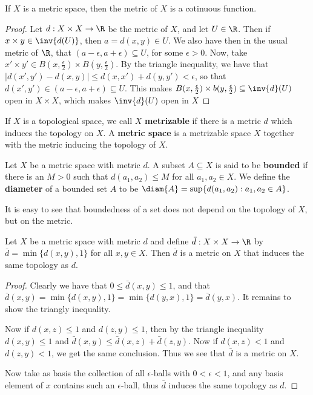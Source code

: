 \begin{lemma}\label{2.2.3}
    If $X$ is a metric space, then the metric of  $X$ is a cotinuous function.
\end{lemma}
\begin{proof}
    Let $d:X \times X \rightarrow \R$ be the metric of $X$, and let  $U \in \R$.
    Then if  $x \times y \in \inv{d(U)}$, then $a=d(x,y) \in U$. We also have
    then in the usual metric of $\R$, that  $(a-\epsilon,a+\epsilon) \subseteq
    U$, for some $\epsilon>0$. Now, take  $x' \times y' \in
    B(x,\frac{\epsilon}{2}) \times B(y,\frac{\epsilon}{2})$. By the triangle
    inequality, we have that $|d(x',y')-d(x,y)| \leq d(x,x')+d(y,y')<\epsilon$,
    so that $d(x',y') \in (a-\epsilon,a+\epsilon) \subseteq U$. This makes $B(x,
    \frac{\epsilon}{2}) \times b(y,\frac{\epsilon}{2}) \subseteq \inv{d}(U)$
    open in $X \times X$, which makes  $\inv{d}(U)$ open in $X$
\end{proof}

\begin{definition}
    If $X$ is a topological space, we call  $X$ \textbf {metrizable} if there is a metric $d$ which
    induces the topology on $X$. A \textbf {metric space} is a metrizable space $X$ together with
    the metric inducing the topology of $X$.
\end{definition}

\begin{definition}
    Let $X$ be a metric space with metric $d$. A subset $A \subseteq X$ is said to be \textbf
    {bounded} if there is an $M>0$ such that $d(a_1,a_2) \leq M$ for all $ a_1,a_2 \in X$. We define
    the \textbf{diameter} of a bounded set $A$ to be $\diam{A}=\sup\{d(a_1,a_2):a_1,a_2 \in A\}$.
\end{definition}

It is easy to see that boundedness of a set does not depend on the topology of $X$, but on the
metric.

\begin{theorem}\label{2.2.4}
    Let $X$ be a metric space with metric $d$ and define  $\bar{d}:X \times X \rightarrow \R$ by
    $\bar{d}=\min\{d(x,y),1\}$ for all $x,y \in X$. Then  $\bar{d}$ is a metric on $X$ that induces
    the same topology as  $d$.
\end{theorem}
\begin{proof}
    Clearly we have that $0 \leq \bar{d}(x,y) \leq 1$, and that
    $\bar{d}(x,y)=\min\{d(x,y),1\}=\min\{d(y,x),1\}=\bar{d}(y,x)$. It remains to show the triangly
    inequality.

    Now if $d(x,z) \leq 1$ and $d(z,y) \leq 1$, then by the triangle inequality $d(x,y) \leq 1$ and
    $\bar{d}(x,y) \leq \bar{d}(x,z)+\bar{d}(z,y)$. Now if $d(x,z)<1$ and $d(z,y)<1$, we get the same
    conclusion. Thus we see that $\bar{d}$ is a metric on $X$.

    Now take as basis the collection of all  $\epsilon$-balls with  $0<\epsilon<1$, and any basis
    element of  $x$ contains such an  $\epsilon$-ball, thus  $\bar{d}$ induces the same topology as
    $d$.
\end{proof}

